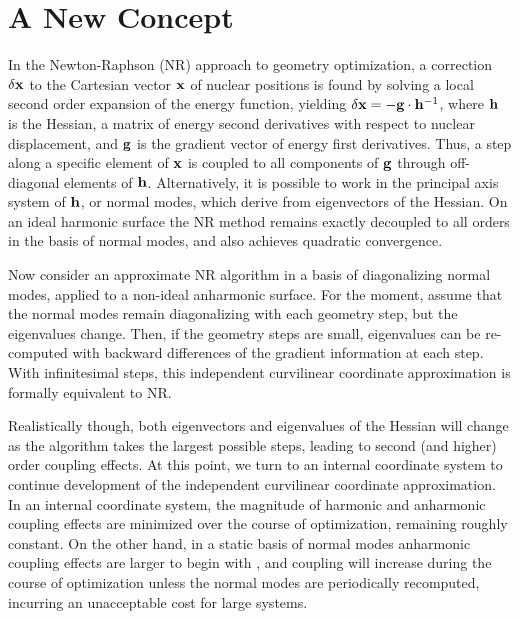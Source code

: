 \documentclass[prl,aps,preprint,showpacs,superbib]{revtex4}
\begin{document}
\section{A New Concept} \label{concept}

In the Newton-Raphson (NR) approach to geometry optimization, a correction $\delta {\bf x}$  to the 
Cartesian vector $\bf x$ of nuclear positions is found by solving a local second order expansion of the 
energy function, yielding  $\delta {\bf x}  = - {\bf g}\cdot {\bf h}^{-1}$,  where $\bf h$ 
is the Hessian, a matrix of energy second derivatives with respect to nuclear displacement,
and $\bf g$ is the gradient vector of energy first derivatives.  Thus, 
a step along a specific element of $\bf x$ is coupled to all components of $\bf g$ through off-diagonal 
elements of $\bf h$.  Alternatively, it is possible to work in the principal axis system of $\bf h$, or 
normal modes,  which derive from eigenvectors of the Hessian.  On an ideal harmonic surface the NR method 
remains exactly decoupled to all orders in the basis of normal modes, and also achieves quadratic convergence.  

Now consider an approximate NR algorithm in a basis of diagonalizing normal modes,  applied to a 
non-ideal anharmonic surface.  For the moment,  assume that the normal modes remain diagonalizing with each
geometry step, but the eigenvalues change.  Then, if the geometry steps are small,
eigenvalues can be re-computed with backward differences of the gradient information at each step. 
With infinitesimal steps, this independent curvilinear coordinate approximation is formally equivalent 
to NR.  

Realistically though, both eigenvectors and eigenvalues of the Hessian will change as the 
algorithm takes the largest possible steps, leading to second (and higher) order coupling effects.  At this point, 
we turn to an internal coordinate system to continue development of the independent curvilinear coordinate 
approximation.  In an internal coordinate system, the magnitude of harmonic and anharmonic coupling
effects are minimized over the course of optimization, remaining roughly constant.  On the other hand,
in a static basis of normal modes anharmonic coupling effects are larger to begin with \cite{fogarasi_diaghess}, 
and coupling will increase during the course of optimization unless the normal modes are 
periodically recomputed, incurring an unacceptable cost for large systems.  
\end{document}

